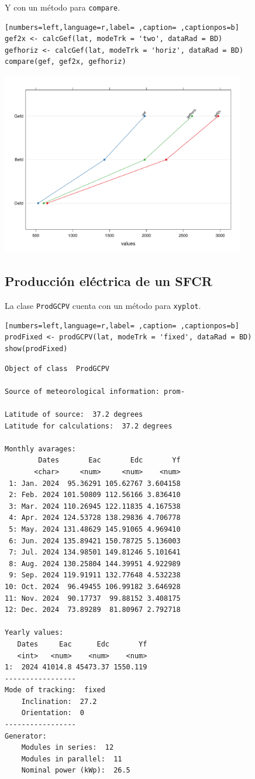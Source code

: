 Y con un método para \texttt{compare}.
\begin{lstlisting}[numbers=left,language=r,label= ,caption= ,captionpos=b]
gef2x <- calcGef(lat, modeTrk = 'two', dataRad = BD)
gefhoriz <- calcGef(lat, modeTrk = 'horiz', dataRad = BD)
compare(gef, gef2x, gefhoriz)
\end{lstlisting}

\begin{center}
\includegraphics[width=0.8\textwidth]{figuras/codigo-gef2.pdf}
\end{center}


\subsection{Producción eléctrica de un SFCR}
\label{sec:orgfff9fa7}
La clase \texttt{ProdGCPV} cuenta con un método para \texttt{xyplot}.
\begin{lstlisting}[numbers=left,language=r,label= ,caption= ,captionpos=b]
prodFixed <- prodGCPV(lat, modeTrk = 'fixed', dataRad = BD)
show(prodFixed)
\end{lstlisting}

\begin{verbatim}
Object of class  ProdGCPV 

Source of meteorological information: prom- 

Latitude of source:  37.2 degrees
Latitude for calculations:  37.2 degrees

Monthly avarages:
        Dates       Eac       Edc       Yf
       <char>     <num>     <num>    <num>
 1: Jan. 2024  95.36291 105.62767 3.604158
 2: Feb. 2024 101.50809 112.56166 3.836410
 3: Mar. 2024 110.26945 122.11835 4.167538
 4: Apr. 2024 124.53728 138.29836 4.706778
 5: May. 2024 131.48629 145.91065 4.969410
 6: Jun. 2024 135.89421 150.78725 5.136003
 7: Jul. 2024 134.98501 149.81246 5.101641
 8: Aug. 2024 130.25804 144.39951 4.922989
 9: Sep. 2024 119.91911 132.77648 4.532238
10: Oct. 2024  96.49455 106.99182 3.646928
11: Nov. 2024  90.17737  99.88152 3.408175
12: Dec. 2024  73.89289  81.80967 2.792718

Yearly values:
   Dates     Eac      Edc       Yf
   <int>   <num>    <num>    <num>
1:  2024 41014.8 45473.37 1550.119
-----------------
Mode of tracking:  fixed 
    Inclination:  27.2 
    Orientation:  0 
-----------------
Generator:
    Modules in series:  12 
    Modules in parallel:  11 
    Nominal power (kWp):  26.5
\end{verbatim}

